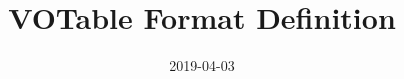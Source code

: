 \newenvironment{TABULAR}[2]{\begin{tabular}{#2}}{\end{tabular}}
\newenvironment{plain}{\begin{quote}}{\end{quote}}
\fi


\title{VOTable Format Definition}
\date{2019-04-03}



